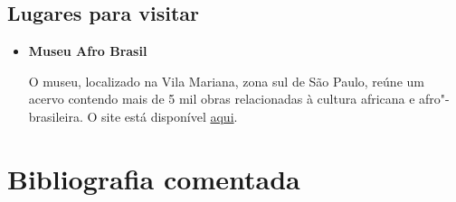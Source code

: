 \documentclass[11pt]{extarticle}
\begin{document}
\subsection{Lugares para visitar}

\begin{itemize}
\item\textbf{Museu Afro Brasil}

O museu, localizado na Vila Mariana, zona sul de São Paulo, reúne um
acervo contendo mais de 5 mil obras relacionadas à cultura africana e
afro"-brasileira. O site está disponível \href{http://www.museuafrobrasil.org.br/}{aqui}.
\end{itemize}

\section{Bibliografia comentada}
\end{document}
